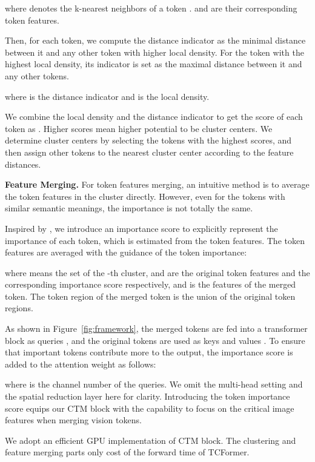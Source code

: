 \documentclass[10pt,twocolumn,letterpaper]{article}
\begin{document}
where  denotes the k-nearest neighbors of a token .  and  are their corresponding token features.


Then, for each token, we compute the distance indicator as the minimal distance between it and any other token with higher local density. 
For the token with the highest local density, its indicator is set as the maximal distance between it and any other tokens. 

where  is the distance indicator and  is the local density.

We combine the local density and the distance indicator to get the score of each token as . Higher scores mean higher potential to be cluster centers. 
We determine cluster centers by selecting the tokens with the highest scores, and then assign other tokens to the nearest cluster center according to the feature distances.



\textbf{Feature Merging.}
For token features merging, an intuitive method is to average the token features in the cluster directly. However, even for the tokens with similar semantic meanings, the importance is not totally the same. 


Inspired by \cite{rao2021dynamicvit}, we introduce an importance score  to explicitly represent the importance of each token, which is estimated from the token features.
The token features are averaged with the guidance of the token importance:

where  means the set of the -th cluster,  and  are the original token features and the corresponding importance score respectively, and  is the features of the merged token. The token region of the merged token is the union of 
the original token regions.



As shown in Figure~\ref{fig:framework}, the merged tokens are fed into a transformer block as queries , and the original tokens are used as keys  and values . 
To ensure that important tokens contribute more to the output, the importance score  is added to the attention weight as follows:

where  is the channel number of the queries. We omit the multi-head setting and the spatial reduction layer here for clarity.
Introducing the token importance score equips our CTM block with the capability to focus on the critical image features when merging vision tokens.

We adopt an efficient GPU implementation of CTM block. The clustering and feature merging parts only cost  of the forward time of TCFormer.
\end{document}
